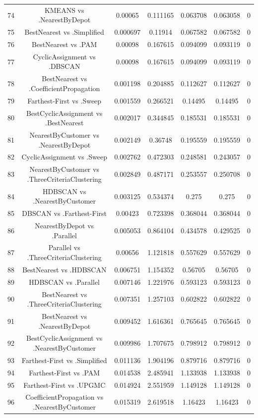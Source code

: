 \documentclass[a4paper,10pt]{article}
\begin{document}
\begin{landscape}
\begin{table}[!htp]
\begin{tabular}{ccccccc}
74&KMEANS vs .NearestByDepot&0.00065&0.111165&0.063708&0.063058&0\\
75&BestNearest vs .Simplified&0.000697&0.11914&0.067582&0.067582&0\\
76&BestNearest vs .PAM&0.00098&0.167615&0.094099&0.093119&0\\
77&CyclicAssignment vs .DBSCAN&0.00098&0.167615&0.094099&0.093119&0\\
78&BestNearest vs .CoefficientPropagation&0.001198&0.204885&0.112627&0.112627&0\\
79&Farthest-First vs .Sweep&0.001559&0.266521&0.14495&0.14495&0\\
80&BestCyclicAssignment vs .BestNearest&0.002017&0.344845&0.185531&0.185531&0\\
81&NearestByCustomer vs .NearestByDepot&0.002149&0.36748&0.195559&0.195559&0\\
82&CyclicAssignment vs .Sweep&0.002762&0.472303&0.248581&0.243057&0\\
83&NearestByCustomer vs .ThreeCriteriaClustering&0.002849&0.487171&0.253557&0.250708&0\\
84&HDBSCAN vs .NearestByCustomer&0.003125&0.534374&0.275&0.275&0\\
85&DBSCAN vs .Farthest-First&0.00423&0.723398&0.368044&0.368044&0\\
86&NearestByDepot vs .Parallel&0.005053&0.864104&0.434578&0.429525&0\\
87&Parallel vs .ThreeCriteriaClustering&0.00656&1.121818&0.557629&0.557629&0\\
88&BestNearest vs .HDBSCAN&0.006751&1.154352&0.56705&0.56705&0\\
89&HDBSCAN vs .Parallel&0.007146&1.221976&0.593123&0.593123&0\\
90&BestNearest vs .ThreeCriteriaClustering&0.007351&1.257103&0.602822&0.602822&0\\
91&BestNearest vs .NearestByDepot&0.009452&1.616361&0.765645&0.765645&0\\
92&BestCyclicAssignment vs .NearestByCustomer&0.009986&1.707675&0.798912&0.798912&0\\
93&Farthest-First vs .Simplified&0.011136&1.904196&0.879716&0.879716&0\\
94&Farthest-First vs .PAM&0.014538&2.485941&1.133938&1.133938&0\\
95&Farthest-First vs .UPGMC&0.014924&2.551959&1.149128&1.149128&0\\
96&CoefficientPropagation vs .NearestByCustomer&0.015319&2.619518&1.16423&1.16423&0\\

\end{tabular}
\end{table}
\end{landscape}
\end{document}

